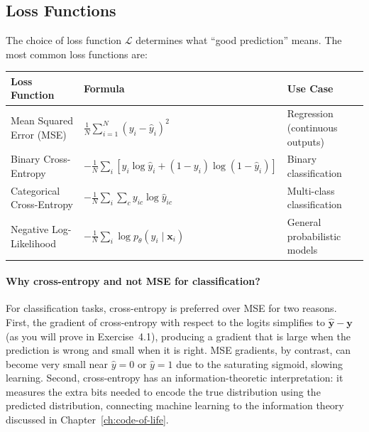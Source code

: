 \subsection{Loss Functions}

The choice of loss function $\mathcal{L}$ determines what ``good prediction'' means. The most common loss functions are:

\begin{center}
\renewcommand{\arraystretch}{1.2}
\begin{tabularx}{0.92\textwidth}{L{3.5cm} L{4.5cm} Y}
\toprule
\textbf{Loss Function} & \textbf{Formula} & \textbf{Use Case} \\
\midrule
Mean Squared Error (MSE) & $\frac{1}{N}\sum_{i=1}^N (y_i - \hat{y}_i)^2$ & Regression (continuous outputs) \\
Binary Cross-Entropy & $-\frac{1}{N}\sum_i [y_i \log \hat{y}_i + (1-y_i)\log(1-\hat{y}_i)]$ & Binary classification \\
Categorical Cross-Entropy & $-\frac{1}{N}\sum_i \sum_c y_{ic} \log \hat{y}_{ic}$ & Multi-class classification \\
Negative Log-Likelihood & $-\frac{1}{N}\sum_i \log p_\theta(y_i \mid \mathbf{x}_i)$ & General probabilistic models \\
\bottomrule
\end{tabularx}
\end{center}

\paragraph{Why cross-entropy and not MSE for classification?} For classification tasks, cross-entropy is preferred over MSE for two reasons. First, the gradient of cross-entropy with respect to the logits simplifies to $\hat{\mathbf{y}} - \mathbf{y}$ (as you will prove in Exercise~4.1), producing a gradient that is large when the prediction is wrong and small when it is right. MSE gradients, by contrast, can become very small near $\hat{y} = 0$ or $\hat{y} = 1$ due to the saturating sigmoid, slowing learning. Second, cross-entropy has an information-theoretic interpretation: it measures the extra bits needed to encode the true distribution using the predicted distribution, connecting machine learning to the information theory discussed in Chapter~\ref{ch:code-of-life}.

